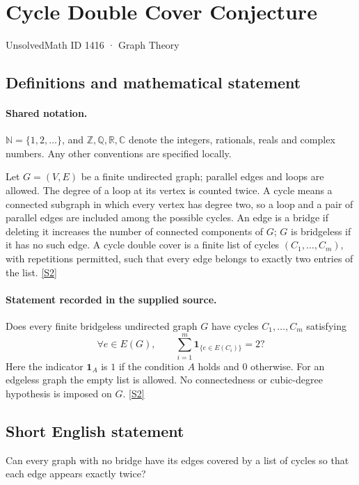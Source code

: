 \documentclass[11pt]{article}
\newcommand{\sref}[2]{\hyperlink{source:#1:#2}{[S#2]}}
\begin{document}
\setcounter{section}{1415}
\section{Cycle Double Cover Conjecture}\label{1416}
{\small\sffamily UnsolvedMath ID 1416 · Graph Theory}
\subsection{Definitions and mathematical statement}

\paragraph{Shared notation.}$\mathbb N=\{1,2,\ldots\}$, and $\mathbb Z,\mathbb Q,\mathbb R,\mathbb C$ denote the integers, rationals, reals and complex numbers. Any other conventions are specified locally.


Let $G=(V,E)$ be a finite undirected graph; parallel edges and loops are allowed. The degree of a loop at its vertex is counted twice. A cycle means a connected subgraph in which every vertex has degree two, so a loop and a pair of parallel edges are included among the possible cycles. An edge is a bridge if deleting it increases the number of connected components of $G$; $G$ is bridgeless if it has no such edge. A cycle double cover is a finite list of cycles $(C_1,\ldots,C_m)$, with repetitions permitted, such that every edge belongs to exactly two entries of the list. \sref{1416}{2}
\paragraph{Statement recorded in the supplied source.}
Does every finite bridgeless undirected graph $G$ have cycles $C_1,\ldots,C_m$ satisfying
\[
 \forall e\in E(G),\qquad
 \sum_{i=1}^m\mathbf 1_{\{e\in E(C_i)\}}=2?
\]
Here the indicator $\mathbf 1_A$ is $1$ if the condition $A$ holds and $0$ otherwise. For an edgeless graph the empty list is allowed. No connectedness or cubic-degree hypothesis is imposed on $G$. \sref{1416}{2}
\subsection{Short English statement}
Can every graph with no bridge have its edges covered by a list of cycles so that each edge appears exactly twice?
\end{document}
